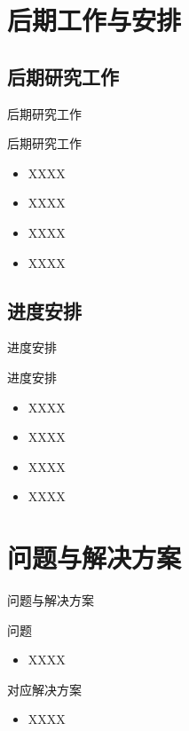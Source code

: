 \documentclass[compress]{beamer}
\begin{document}
\section{后期工作与安排}

\subsection{后期研究工作}

\begin{frame}{后期研究工作}
  \begin{block}{后期研究工作}
    \begin{itemize}
      \setlength{\itemsep}{6pt}
      \item XXXX
      \item XXXX
      \item XXXX
      \item XXXX
    \end{itemize}
  \end{block}
\end{frame}

\subsection{进度安排}

\begin{frame}{进度安排}
  \begin{block}{进度安排}
    \begin{itemize}
      \setlength{\itemsep}{6pt}
      \item XXXX\cite{liu2016}
      \item XXXX\cite{ren2010}
      \item XXXX
      \item XXXX
    \end{itemize}
  \end{block}
\end{frame}

\section{问题与解决方案}

\begin{frame}{问题与解决方案}
  \begin{block}{问题}
    \begin{itemize}
      \item XXXX
    \end{itemize}
  \end{block}
  \begin{block}{对应解决方案}
    \begin{itemize}
      \item XXXX
    \end{itemize}
  \end{block}
\end{frame}
\end{document}
